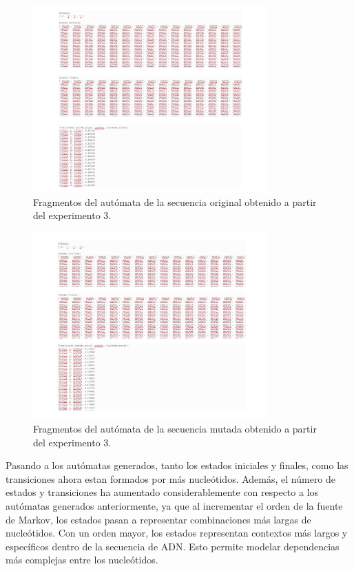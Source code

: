 \documentclass[11pt,spanish,listoffigures,listoftables]{tfgetsinf}
\begin{document}
\begin{figure}[H]
      \centering
      \includegraphics[width=0.8\textwidth]{aut1_exp4.png}
      \caption{Fragmentos del autómata de la secuencia original obtenido a partir del experimento 3.}
      \label{fig:etiqueta_opcional43}
\end{figure}

\begin{figure}[H]
      \centering
      \includegraphics[width=0.8\textwidth]{aut2_exp4.png}
      \caption{Fragmentos del autómata de la secuencia mutada obtenido a partir del experimento 3.}
      \label{fig:etiqueta_opcional44}
\end{figure}

Pasando a los autómatas generados, tanto los estados iniciales y finales, como las transiciones ahora estan formados por más nucleótidos. Además, el número de estados y transiciones ha aumentado considerablemente con respecto a los autómatas generados anteriormente, ya que al incrementar el orden de la fuente de Markov, los estados pasan a representar combinaciones más largas de nucleótidos. Con un orden mayor, los estados representan contextos más largos y específicos dentro de la secuencia de \ac{ADN}. Esto permite modelar dependencias más complejas entre los nucleótidos.
\end{document}
